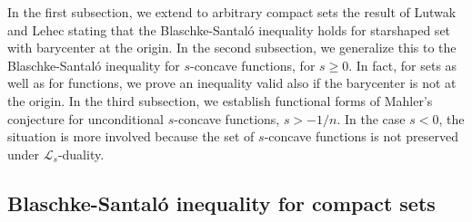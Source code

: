 \documentclass[10pt]{amsart}
\theoremstyle{definition}
\theoremstyle{remark}
\renewcommand{\L}{\mathcal{L}}
\begin{document}
In the first subsection, we extend to arbitrary compact sets the result of Lutwak \cite{L91} and Lehec \cite{lehec3} stating that the  Blaschke-Santal\'o inequality holds for starshaped set with barycenter at the origin. In the second subsection, we generalize this to the Blaschke-Santal\'o inequality for $s$-concave functions, for $s\ge0$. In fact, for sets as well as for functions, we prove an inequality valid also if the barycenter is not at the origin. In the third subsection, we establish functional forms of Mahler's conjecture for unconditional $s$-concave functions, $s>-1/n$. In the case $s<0$, the situation is more involved because the set of $s$-concave functions is not preserved under $\L_s$-duality. 


\subsection{Blaschke-Santal\'o inequality for compact sets}
\end{document}
